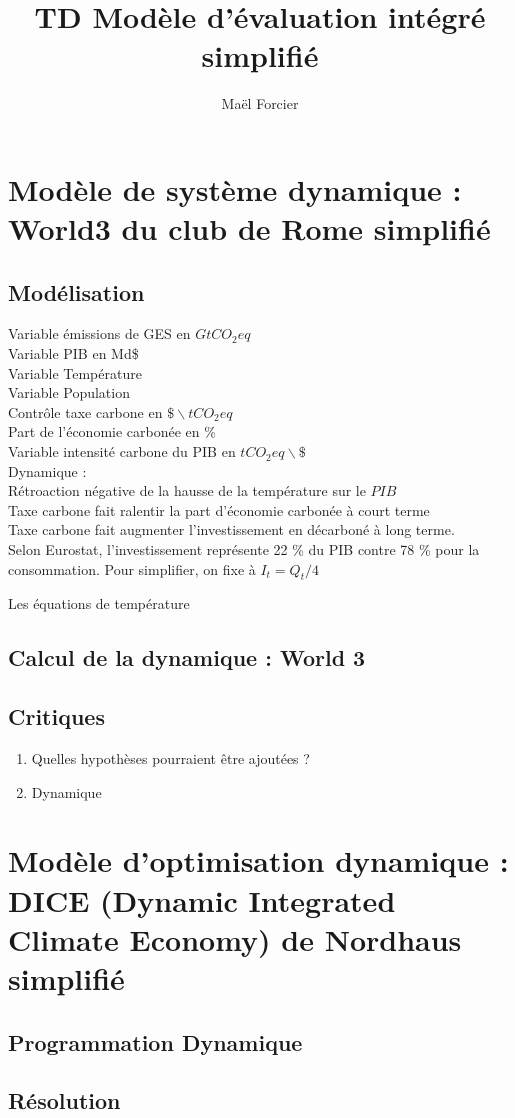 \documentclass[12pt]{article}
\title{TD Modèle d'évaluation intégré simplifié}
\author{Maël Forcier}
\newcommand{\tco}{tCO_2eq}
\theoremstyle{remark}
\begin{document}
\maketitle


\section{Modèle de système dynamique : World3 du club de Rome simplifié}
\subsection{Modélisation}
Variable émissions de GES en $G\tco$\\
Variable PIB en Md\$\\
Variable Température \\
Variable Population \\
Contrôle taxe carbone en $\$ \backslash \tco$ \\
Part de l'économie carbonée en \% \\
Variable intensité carbone du PIB en $\tco \backslash \$ $
\\
Dynamique : \\
Rétroaction négative de la hausse de la température sur le $PIB$ \\
Taxe carbone fait ralentir la part d'économie carbonée à court terme\\
Taxe carbone fait augmenter l'investissement en décarboné à long terme.\\
Selon Eurostat, l'investissement représente 22 \% du PIB contre 78 \% pour la consommation. Pour simplifier, on fixe à $I_t=Q_t/4$

Les équations de température

\subsection{Calcul de la dynamique : World 3}

\subsection{Critiques}
\begin{enumerate}
\item Quelles hypothèses pourraient être ajoutées ?
\item Dynamique
\end{enumerate}
\section{Modèle d'optimisation dynamique : DICE (Dynamic Integrated Climate Economy) de Nordhaus simplifié}

\subsection{Programmation Dynamique}

\subsection{Résolution }
\end{document}
